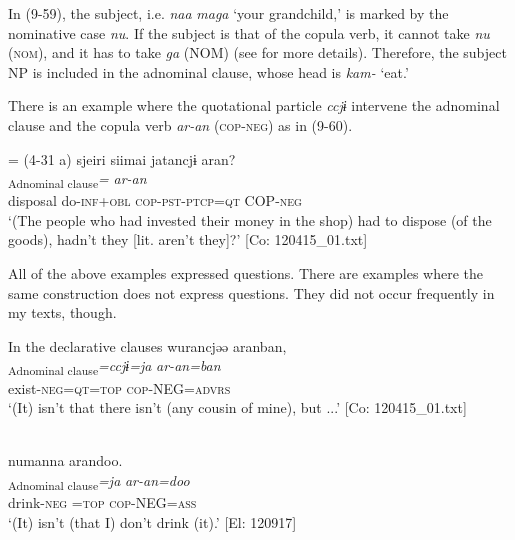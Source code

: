 In (9-59), the subject, i.e. \textit{naa} \textit{maga} ‘your grandchild,’ is marked by the nominative case \textit{nu}. If the subject is that of the copula verb, it cannot take \textit{nu} (\textsc{nom}), and it has to take \textit{ga} (NOM) (see  for more details). Therefore, the subject NP is included in the adnominal clause, whose head is \textit{kam-} ‘eat.’

There is an example where the quotational particle \textit{ccjɨ} intervene the adnominal clause and the copula verb \textit{ar-an} (\textsc{cop}-\textsc{neg}) as in (9-60).

\ea{} = (4-31 a) \label{ex:9.60}
 \glll  {\textbar}sjeiri{\textbar}  siimai  jatancjɨ  aran?\\
    [\textit{sjeiri}  \textit{sɨr-i+mai}  \textit{jar-tar-n}]\textsubscript{Adnominal clause}\textit{=}  \textit{ar-an}\\
    disposal  do-\textsc{inf}+\textsc{obl}  \textsc{cop}-\textsc{pst}-\textsc{ptcp}=\textsc{qt}  COP-\textsc{neg}\\
    \glt     ‘(The people who had invested their money in the shop) had to dispose (of the goods), hadn’t they [lit. aren’t they]?’ [Co: 120415\_01.txt]
\z

  All of the above examples expressed questions. There are examples where the same construction does not express questions. They did not occur frequently in my texts, though.

\ea   In the declarative clauses \label{ex:9.61}
\ea %
\glll   wurancjəə  aranban,\\
      [\textit{wur-an}]\textsubscript{Adnominal clause}\textit{=ccjɨ=ja}  \textit{ar-an=ban}\\
      exist-\textsc{neg}=\textsc{qt}=\textsc{top}  \textsc{cop}-NEG=\textsc{advrs}\\
      \glt       ‘(It) isn’t that there isn’t (any cousin of mine), but ...’ [Co: 120415\_01.txt]

\ex{}\\
    \glll  numanna  arandoo.\\
      [\textit{num-an}]\textsubscript{Adnominal clause}\textit{=ja}  \textit{ar-an=doo}\\
      drink-\textsc{neg} =\textsc{top}  \textsc{cop}-NEG=\textsc{ass}\\
      \glt       ‘(It) isn’t (that I) don’t drink (it).’ [El: 120917]
    \z
\z

